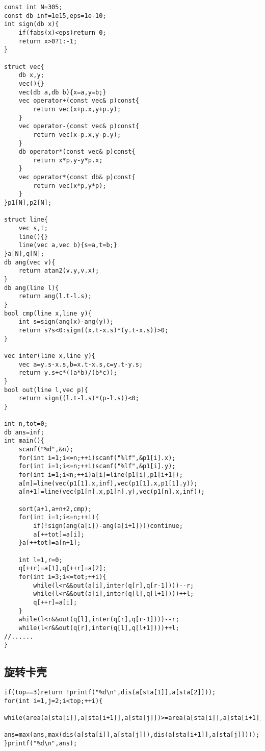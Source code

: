 \documentclass[12pt]{ctexart}
\begin{document}
\begin{lstlisting}
const int N=305;
const db inf=1e15,eps=1e-10;
int sign(db x){
	if(fabs(x)<eps)return 0;
	return x>0?1:-1;
}

struct vec{
	db x,y;
	vec(){}
	vec(db a,db b){x=a,y=b;}
	vec operator+(const vec& p)const{
		return vec(x+p.x,y+p.y);
	}
	vec operator-(const vec& p)const{
		return vec(x-p.x,y-p.y);
	}
	db operator*(const vec& p)const{
		return x*p.y-y*p.x;
	}
	vec operator*(const db& p)const{
		return vec(x*p,y*p);
	}
}p1[N],p2[N];

struct line{
	vec s,t;
	line(){}
	line(vec a,vec b){s=a,t=b;}
}a[N],q[N];
db ang(vec v){
	return atan2(v.y,v.x);
}
db ang(line l){
	return ang(l.t-l.s);
}
bool cmp(line x,line y){
	int s=sign(ang(x)-ang(y));
	return s?s<0:sign((x.t-x.s)*(y.t-x.s))>0;
}

vec inter(line x,line y){
	vec a=y.s-x.s,b=x.t-x.s,c=y.t-y.s;
	return y.s+c*((a*b)/(b*c));
}
bool out(line l,vec p){
	return sign((l.t-l.s)*(p-l.s))<0;
}

int n,tot=0;
db ans=inf;
int main(){
	scanf("%d",&n);
	for(int i=1;i<=n;++i)scanf("%lf",&p1[i].x);
	for(int i=1;i<=n;++i)scanf("%lf",&p1[i].y);
	for(int i=1;i<n;++i)a[i]=line(p1[i],p1[i+1]);
	a[n]=line(vec(p1[1].x,inf),vec(p1[1].x,p1[1].y));
	a[n+1]=line(vec(p1[n].x,p1[n].y),vec(p1[n].x,inf));
	
	sort(a+1,a+n+2,cmp);
	for(int i=1;i<=n;++i){
		if(!sign(ang(a[i])-ang(a[i+1])))continue;
		a[++tot]=a[i];
	}a[++tot]=a[n+1];
	
	int l=1,r=0;
	q[++r]=a[1],q[++r]=a[2];
	for(int i=3;i<=tot;++i){
		while(l<r&&out(a[i],inter(q[r],q[r-1])))--r;
		while(l<r&&out(a[i],inter(q[l],q[l+1])))++l;
		q[++r]=a[i];
	}
	while(l<r&&out(q[l],inter(q[r],q[r-1])))--r;
	while(l<r&&out(q[r],inter(q[l],q[l+1])))++l;
//......
}
\end{lstlisting}

\subsection{旋转卡壳}

\begin{lstlisting}
if(top==3)return !printf("%d\n",dis(a[sta[1]],a[sta[2]]));
for(int i=1,j=2;i<top;++i){
	while(area(a[sta[i]],a[sta[i+1]],a[sta[j]])>=area(a[sta[i]],a[sta[i+1]],a[sta[j%top+1]]))j=j%top+1;
	ans=max(ans,max(dis(a[sta[i]],a[sta[j]]),dis(a[sta[i+1]],a[sta[j]])));
}printf("%d\n",ans);
\end{lstlisting}
\end{document}
